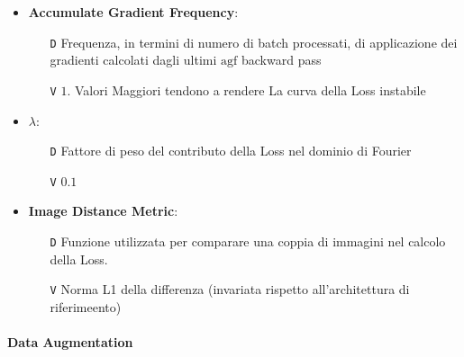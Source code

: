 \documentclass[a4paper,10pt,twocolumn]{article}
\begin{document}
\begin{itemize}[topsep=5pt, itemsep=7pt]
  \item
    \textbf{Accumulate Gradient Frequency}:
    \begin{itemize}[topsep=0pt, noitemsep]
      \item[\texttt{D}] Frequenza, in termini di numero di batch processati, di applicazione dei gradienti calcolati dagli ultimi
        $\mathrm{agf}$ backward pass
      \item[\texttt{V}] $1$. Valori Maggiori tendono a rendere La curva della Loss instabile
    \end{itemize}

  \item
    \textbf{$\lambda$}:
    \begin{itemize}[topsep=0pt, noitemsep]
      \item[\texttt{D}] Fattore di peso del contributo della Loss nel dominio di Fourier
      \item[\texttt{V}] $0.1$
    \end{itemize}

  \item
    \textbf{Image Distance Metric}:
    \begin{itemize}[topsep=0pt, noitemsep]
      \item[\texttt{D}] Funzione utilizzata per comparare una coppia di immagini nel calcolo della Loss.
      \item[\texttt{V}] Norma L1 della differenza (invariata rispetto all'architettura di riferimeento)
    \end{itemize}
\end{itemize}

\paragraph{Data Augmentation}
\end{document}
